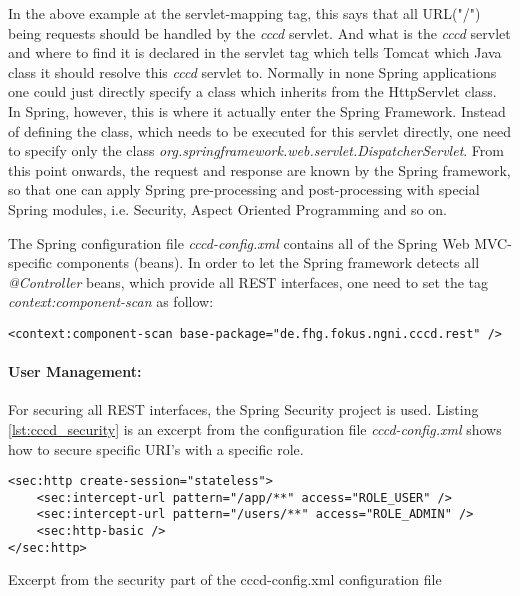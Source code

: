 In the above example at the servlet-mapping tag, this says that all URL("/") being requests should be handled by the \textit{cccd} servlet.  And what is the \textit{cccd} servlet and where to find it is declared in the servlet tag which tells Tomcat which Java class it should resolve this \textit{cccd} servlet to. Normally in none Spring applications one could just directly specify a class which inherits from the HttpServlet class. In Spring, however, this is where it actually enter the Spring Framework.  Instead of defining the class, which needs to be executed for this servlet directly, one need to specify only the class \textit{org.springframework.web.servlet.DispatcherServlet}. From this point onwards, the request and response are known by the Spring framework, so that one can apply Spring pre-processing and post-processing with special Spring modules, i.e. Security, Aspect Oriented Programming and so on.

The Spring configuration file \textit{cccd-config.xml} contains all of the Spring Web MVC-specific components (beans). In order to let the Spring framework detects all \textit{@Controller} beans, which provide all \ac{REST} interfaces, one need to set the tag \textit{context:component-scan} as follow:
\begin{code}
\begin{verbatim}
<context:component-scan base-package="de.fhg.fokus.ngni.cccd.rest" />
\end{verbatim}
\end{code}

\paragraph{User Management:} For securing all \ac{REST} interfaces, the Spring Security project is used. Listing \ref{lst:cccd_security} is an excerpt from the configuration file \textit{cccd-config.xml} shows how to secure specific URI's with a specific role.
\begin{code}
\begin{verbatim}
<sec:http create-session="stateless">
 	<sec:intercept-url pattern="/app/**" access="ROLE_USER" />
	<sec:intercept-url pattern="/users/**" access="ROLE_ADMIN" />
	<sec:http-basic />
</sec:http>
\end{verbatim}
\caption{Excerpt from the security part of the cccd-config.xml configuration file}
\label{lst:cccd_security}
\end{code}

